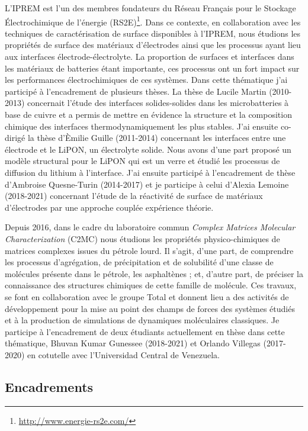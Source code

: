 \documentclass[11pt]{artuppax}
\newcounter{subsec}[section]
\begin{document}
L'IPREM est l'un des membres fondateurs du Réseau Français pour le Stockage Électrochimique de l'énergie (RS2E)\footnote{\url{http://www.energie-rs2e.com/}}. Dans ce contexte, en collaboration avec les techniques de caractérisation de surface disponibles à l'IPREM, nous étudions les propriétés de surface des matériaux d'électrodes ainsi que les processus ayant lieu aux interfaces électrode-électrolyte. La proportion de surfaces et interfaces dans les matériaux de batteries étant importante, ces processus ont un fort impact sur les performances électrochimiques de ces systèmes. Dans cette thématique j'ai participé à l'encadrement de plusieurs thèses. La thèse de Lucile Martin (2010-2013) concernait l'étude des interfaces solides-solides dans les microbatteries à base de cuivre et a permis de mettre en évidence la structure et la composition chimique des interfaces thermodynamiquement les plus stables. J'ai ensuite co-dirigé la thèse d'Èmilie Guille (2011-2014) concernant les interfaces entre une électrode et le LiPON, un électrolyte solide. Nous avons d'une part proposé un modèle structural pour le LiPON qui est un verre et étudié les processus de diffusion du lithium à l'interface. J'ai ensuite participé à l'encadrement de thèse d'Ambroise Quesne-Turin (2014-2017) et je participe à celui d'Alexia Lemoine (2018-2021) concernant l'étude de la réactivité de surface de matériaux d'électrodes par une approche couplée expérience théorie.

Depuis 2016, dans le cadre du laboratoire commun \textit{Complex Matrices Molecular Characterization} (C2MC) nous étudions les propriétés physico-chimiques de matrices complexes issues du pétrole lourd. Il s'agit, d'une part, de comprendre les processus d'agrégation, de précipitation et de solubilité d'une classe de molécules présente dans le pétrole, les asphaltènes ; et, d'autre part, de préciser la connaissance des structures chimiques de cette famille de molécule. Ces travaux, se font en collaboration avec le groupe Total et donnent lieu a des activités de développement pour la mise au point des champs de forces des systèmes étudiés et à la production de simulations de dynamiques moléculaires classiques. Je participe à l'encadrement de deux étudiants actuellement en thèse dans cette thématique, Bhuvan Kumar Gunessee (2018-2021) et Orlando Villegas (2017-2020) en cotutelle avec l'Universidad Central de Venezuela.

\subsection{Encadrements}
\end{document}
